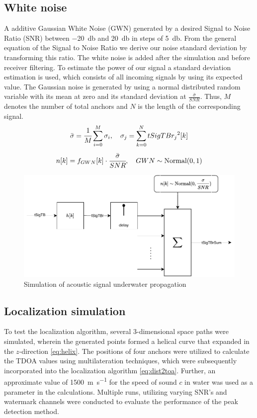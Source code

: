 \subsection{White noise}
A additive Gaussian White Noise (GWN) generated by a desired Signal to Noise Ratio (SNR) between \SI{-20}{\decibel} and \SI{20}{\decibel} in steps of \SI{5}{\decibel}. From the general equation of the Signal to Noise Ratio we derive our noise standard deviation by transforming this ratio. The white noise is added after the simulation and before receiver filtering. To estimate the power of our signal a standard deviation estimation is used, which consists of all incoming signals by using its expected value. The Gaussian noise is generated by using a normal distributed random variable with its mean at zero and its standard deviation at $\frac{\bar{\sigma}}{SNR}$. Thus, $M$ denotes the number of total anchors and $N$ is the length of the corresponding signal.
\begin{equation}	
	\bar{\sigma}=\cfrac{1}{M}\sum_{i=0}^{M}\sigma_i,~~~\sigma_j=\sum_{k=0}^{N}{tSigTBr_j}^2[k]
\end{equation}
\begin{equation}
	n[k]=f_{GWN}[k]\cdot \cfrac{\bar{\sigma}}{SNR},~~~GWN\sim\text{Normal}(0,1)
\end{equation}
\begin{figure}[h]
	\centering
	\includegraphics[width=\linewidth]{images/simsig}
	
	\caption{Simulation of acoustic signal underwater propagation}
	\label{fig:simsig}
\end{figure}

\subsection{Localization simulation}
To test the localization algorithm, several 3-dimensional space paths were simulated, wherein the generated points formed a helical curve that expanded in the $z$-direction \ref{eq:helix}. The positions of four anchors were utilized to calculate the TDOA values using multilateration techniques, which were subsequently incorporated into the localization algorithm \ref{eq:dist2toa}. Further, an approximate value of \SI{1500}{\meter\per\second} for the speed of sound $c$ in water was used as a parameter in the calculations. Multiple runs, utilizing varying SNR's and watermark channels were conducted to evaluate the performance of the peak detection method.

